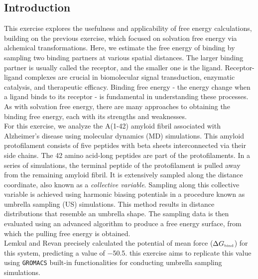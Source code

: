 \documentclass[9pt,tutorial]{livecoms}
\begin{document}
\subsection*{Introduction}
This exercise explores the usefulness and applicability of free energy calculations, building on the previous exercise, which focused on solvation free energy via alchemical transformations. Here, we estimate the free energy of binding by sampling two binding partners at various spatial distances. The larger binding partner is usually called the receptor, and the smaller one is the ligand. Receptor-ligand complexes are crucial in biomolecular signal transduction, enzymatic catalysis, and therapeutic efficacy.\cite{Gumbart_2012} Binding free energy - the energy change when a ligand binds to its receptor - is fundamental in understanding these processes. As with solvation free energy, there are many approaches to obtaining the binding free energy, each with its strengths and weaknesses.\\
For this exercise, we analyze the A\textbeta(1-42) amyloid fibril associated with Alzheimer's disease using molecular dynamics (MD) simulations.\cite{L_hrs_2005} This amyloid protofilament consists of five peptides with beta sheets interconnected via their side chains. The 42 amino acid-long peptides are part of the protofilaments.\cite{Benson_2020} In a series of simulations, the terminal peptide of the protofilament is pulled away from the remaining amyloid fibril. It is extensively sampled along the distance coordinate, also known as a \textit{collective variable}. Sampling along this collective variable is achieved using harmonic biasing potentials in a procedure known as umbrella sampling (US) simulations.\cite{Torrie_1977} This method results in distance distributions that resemble an umbrella shape. The sampling data is then evaluated using an advanced algorithm to produce a free energy surface, from which the pulling free energy is obtained.\cite{Kumar_1992}\\
Lemkul and Revan precisely calculated the potential of mean force ($\Delta G_\text{\tiny bind}$) for this system, predicting a value of \SI{-50.5}{\kcalm}.\cite{Lemkul_2010} this exercise aims to replicate this value using \texttt{GROMACS} built-in functionalities for conducting umbrella sampling simulations.
\end{document}
